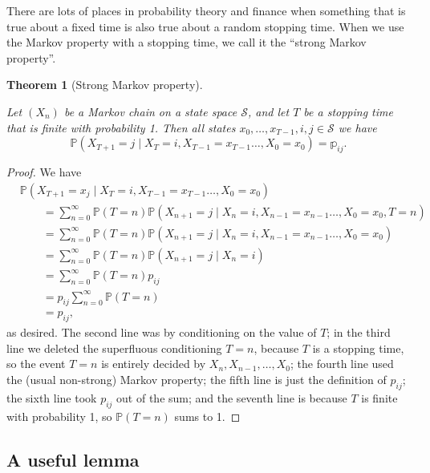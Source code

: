 \documentclass[
  a4paper,
]{article}
\newtheorem{theorem}{Theorem}[section]
\theoremstyle{definition}
\theoremstyle{definition}
\theoremstyle{definition}
\theoremstyle{remark}
\begin{document}
There are lots of places in probability theory and finance when something that is true about a fixed time is also true about a random stopping time. When we use the Markov property with a stopping time, we call it the ``strong Markov property''.

\begin{theorem}[Strong Markov property]
\protect\hypertarget{thm:strong-markov}{}\label{thm:strong-markov}

Let \((X_n)\) be a Markov chain on a state space \(\mathcal S\), and let \(T\) be a stopping time that is finite with probability 1. Then all states \(x_0, \dots,x_{T-1}, i, j \in \mathcal S\) we have
\[  \mathbb P(X_{T+1}=j \mid X_T=i, X_{T-1} = x_{T-1} \dots, X_0 = x_0) = \mathbb p_{ij} . \]

\end{theorem}

\begin{proof}

We have
\begin{align*}
&\mathbb P(X_{T+1}={}x_j \mid X_T=i, X_{T-1} = x_{T-1} \dots, X_0 = x_0) \\
&\qquad{}= \sum_{n=0}^\infty \mathbb P(T = n) \mathbb P(X_{n+1}=j \mid X_n=i, X_{n-1} = x_{n-1} \dots, X_0 = x_0, T = n) \\
&\qquad{}= \sum_{n=0}^\infty \mathbb P(T = n) \mathbb P(X_{n+1}=j \mid X_n=i, X_{n-1} = x_{n-1} \dots, X_0 = x_0) \\
&\qquad{}= \sum_{n=0}^\infty \mathbb P(T = n) \mathbb P(X_{n+1}=j \mid X_n=i) \\
&\qquad{}= \sum_{n=0}^\infty \mathbb P(T = n) p_{ij}\\
&\qquad{}= p_{ij} \sum_{n=0}^\infty \mathbb P(T = n) \\
&\qquad{}= p_{ij} ,
\end{align*}
as desired. The second line was by conditioning on the value of \(T\); in the third line we deleted the superfluous conditioning \(T = n\), because \(T\) is a stopping time, so the event \(T = n\) is entirely decided by \(X_n, X_{n-1}, \dots, X_0\); the fourth line used the (usual non-strong) Markov property; the fifth line is just the definition of \(p_{ij}\); the sixth line took \(p_{ij}\) out of the sum; and the seventh line is because \(T\) is finite with probability 1, so \(\mathbb P(T = n)\) sums to 1.

\end{proof}

\hypertarget{S09-lemma}{%
\subsection{A useful lemma}\label{S09-lemma}}
\end{document}
